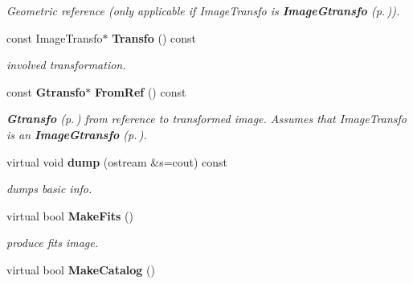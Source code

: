 \begin{CompactItemize}
\begin{CompactList}\small\item\em Geometric reference (only applicable if Image\-Transfo is {\bf Image\-Gtransfo} {\rm (p.\,\pageref{class_imagegtransfo})}).\item\end{CompactList}\item 
{}
const Image\-Transfo$\ast$ {\bf Transfo} () const\label{class_transformedimage_a6}

\begin{CompactList}\small\item\em involved transformation.\item\end{CompactList}\item 
{}
const {\bf Gtransfo}$\ast$ {\bf From\-Ref} () const\label{class_transformedimage_a7}

\begin{CompactList}\small\item\em {\bf Gtransfo} {\rm (p.\,\pageref{class_gtransfo})} from reference to transformed image. Assumes that Image\-Transfo is an {\bf Image\-Gtransfo} {\rm (p.\,\pageref{class_imagegtransfo})}.\item\end{CompactList}\item 
{}
virtual void {\bf dump} (ostream \&s=cout) const\label{class_transformedimage_a8}

\begin{CompactList}\small\item\em dumps basic info.\item\end{CompactList}\item 
{}
virtual bool {\bf Make\-Fits} ()\label{class_transformedimage_a9}

\begin{CompactList}\small\item\em produce fits image.\item\end{CompactList}\item 
{}
virtual bool {\bf Make\-Catalog} ()\label{class_transformedimage_a10}


\end{CompactItemize}

